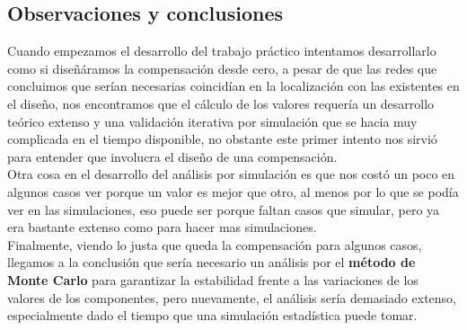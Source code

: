 
\subsection{Observaciones y conclusiones}

Cuando empezamos el desarrollo del trabajo práctico intentamos desarrollarlo como si diseñáramos la compensación desde cero, a pesar de que las redes que concluimos que serían necesarias coincidían en la localización con las existentes en el diseño, nos encontramos que el cálculo de los valores requería un desarrollo teórico extenso y una validación iterativa por simulación que se hacia muy complicada en el tiempo disponible, no obstante este primer intento nos sirvió para entender que involucra el diseño de una compensación. \\
Otra cosa en el desarrollo del análisis por simulación es que nos costó un poco en algunos casos ver porque un valor es mejor que otro, al menos por lo que se podía ver en las simulaciones, eso puede ser porque faltan casos que simular, pero ya era bastante extenso como para hacer mas simulaciones. \\
Finalmente, viendo lo justa que queda la compensación para algunos casos, llegamos a la conclusión que sería necesario un análisis por el \textbf{método de Monte Carlo} para garantizar la estabilidad frente a las variaciones de los valores de los componentes, pero nuevamente, el análisis sería demasiado extenso, especialmente dado el tiempo que una simulación estadística puede tomar.